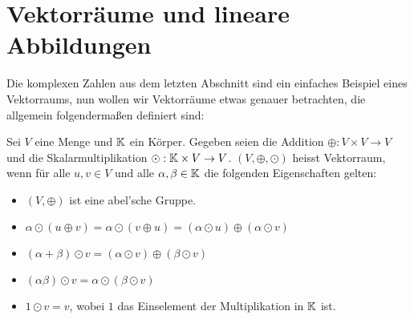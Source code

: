 \chapter{Vektorräume und lineare Abbildungen}
\label{\detokenize{vektorraeume/vektorraeume:vektorraume-und-lineare-abbildungen}}\label{\detokenize{vektorraeume/vektorraeume::doc}}
Die komplexen Zahlen aus dem letzten Abschnitt sind ein einfaches Beispiel eines Vektorraums, nun wollen wir Vektorräume etwas genauer betrachten, die allgemein folgendermaßen definiert sind:
\label{vektorraeume/vektorraeume:definition-0}
\begin{definition}{}{}



Sei \(V\) eine Menge und \(\mathbb{K}\) ein Körper. Gegeben seien die Addition \(\oplus: V \times V \rightarrow V\) und die Skalarmultiplikation \(\odot: \mathbb{K} \times V \rightarrow V\). \((V,\oplus,\odot)\) heisst Vektorraum, wenn für alle \(u,v \in V\) und alle \(\alpha, \beta \in \mathbb{K}\) die folgenden Eigenschaften gelten:
\begin{itemize}
\item {} 
\((V,\oplus)\) ist eine abel’sche Gruppe.

\item {} 
\(\alpha \odot (u \oplus v) = \alpha \odot(v \oplus u) = (\alpha \odot u) \oplus (\alpha \odot v)\)

\item {} 
\((\alpha + \beta) \odot v = (\alpha \odot v) \oplus (\beta \odot v)\)

\item {} 
\((\alpha \beta)\odot v = \alpha \odot (\beta \odot v)\)

\item {} 
\(1 \odot v = v\), wobei \(1\) das Einselement der Multiplikation in \(\mathbb{K}\) ist.

\end{itemize}
\end{definition}

